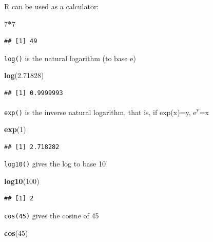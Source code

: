 \documentclass[]{book}
\newenvironment{Shaded}{\begin{snugshade}}{\end{snugshade}}
\newcommand{\DecValTok}[1]{\textcolor[rgb]{0.00,0.00,0.81}{#1}}
\newcommand{\FloatTok}[1]{\textcolor[rgb]{0.00,0.00,0.81}{#1}}
\newcommand{\KeywordTok}[1]{\textcolor[rgb]{0.13,0.29,0.53}{\textbf{#1}}}
\newcommand{\NormalTok}[1]{#1}
\newcommand{\OperatorTok}[1]{\textcolor[rgb]{0.81,0.36,0.00}{\textbf{#1}}}
\begin{document}
R can be used as a calculator:

\begin{Shaded}
\begin{Highlighting}[]
\DecValTok{7}\OperatorTok{*}\DecValTok{7}
\end{Highlighting}
\end{Shaded}

\begin{verbatim}
## [1] 49
\end{verbatim}

\texttt{log()} is the natural logarithm (to base e)

\begin{Shaded}
\begin{Highlighting}[]
\KeywordTok{log}\NormalTok{(}\FloatTok{2.71828}\NormalTok{)}
\end{Highlighting}
\end{Shaded}

\begin{verbatim}
## [1] 0.9999993
\end{verbatim}

\texttt{exp()} is the inverse natural logarithm, that is, if exp(x)=y,
e\textsuperscript{y}=x

\begin{Shaded}
\begin{Highlighting}[]
\KeywordTok{exp}\NormalTok{(}\DecValTok{1}\NormalTok{)}
\end{Highlighting}
\end{Shaded}

\begin{verbatim}
## [1] 2.718282
\end{verbatim}

\texttt{log10()} gives the log to base 10

\begin{Shaded}
\begin{Highlighting}[]
\KeywordTok{log10}\NormalTok{(}\DecValTok{100}\NormalTok{)}
\end{Highlighting}
\end{Shaded}

\begin{verbatim}
## [1] 2
\end{verbatim}

\texttt{cos(45)} gives the cosine of 45

\begin{Shaded}
\begin{Highlighting}[]
\KeywordTok{cos}\NormalTok{(}\DecValTok{45}\NormalTok{)}
\end{Highlighting}
\end{Shaded}
\end{document}
